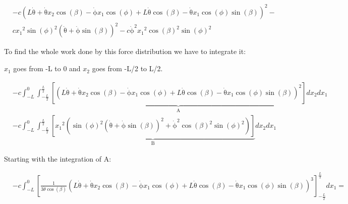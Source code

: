 \subsection{}
\begin{equation}
    \begin{split}
        &-c{\left(L\mathrm{\dot{\theta}}+\mathrm{\dot{\theta}}x_{2}\cos\left(\beta \right)-\mathrm{\dot{\phi}}x_{1}\cos\left(\phi \right)+L\mathrm{\dot{\theta}}\cos\left(\beta \right)-\mathrm{\dot{\theta}}x_{1}\cos\left(\phi \right)\sin\left(\beta \right)\right)}^2-\\
        &c{x_{1}}^2{\sin\left(\phi \right)}^2{\left(\mathrm{\dot{\theta}}+\mathrm{\dot{\phi}}\sin\left(\beta \right)\right)}^2-c{\mathrm{\dot{\phi}}}^2{x_{1}}^2{\cos\left(\beta \right)}^2{\sin\left(\phi \right)}^2 
    \end{split}
\end{equation}

To find the whole work done by this force distribution we have to integrate it:

$x_1$ goes from -L to 0 and $x_2$ goes from -L/2 to L/2.

\begin{equation}
    \begin{split}
        &-c\int_{-L}^0\int_{-\frac{L}{2}}^{\frac{L}{2}}
        \underbrace{\left[{\left(L\mathrm{\dot{\theta}}+\mathrm{\dot{\theta}}x_{2}\cos\left(\beta \right)-\mathrm{\dot{\phi}}x_{1}\cos\left(\phi \right)+L\mathrm{\dot{\theta}}\cos\left(\beta \right)-\mathrm{\dot{\theta}}x_{1}\cos\left(\phi \right)\sin\left(\beta \right)\right)}^2\right]}_{\text{A}}
        dx_2dx_1\\
        &-c\int_{-L}^0\int_{-\frac{L}{2}}^{\frac{L}{2}}
        \underbrace{\left[{x_{1}}^2\left({\sin\left(\phi \right)}^2{\left(\mathrm{\dot{\theta}}+\mathrm{\dot{\phi}}\sin\left(\beta \right)\right)}^2+{\mathrm{\dot{\phi}}}^2{\cos\left(\beta \right)}^2{\sin\left(\phi \right)}^2\right)\right]}_{\text{B}}
         dx_2dx_1
    \end{split}
\end{equation}

Starting with the integration of A:



\begin{equation}
    \begin{split}
        &-c\int_{-L}^0
        \left[\frac{1}{3\dot\theta\cos(\beta)}{\left(L\mathrm{\dot{\theta}}+\mathrm{\dot{\theta}}x_{2}\cos\left(\beta \right)-\mathrm{\dot{\phi}}x_{1}\cos\left(\phi \right)+L\mathrm{\dot{\theta}}\cos\left(\beta \right)-\mathrm{\dot{\theta}}x_{1}\cos\left(\phi \right)\sin\left(\beta \right)\right)}^3\right]
        _{-\frac{L}{2}}^\frac{L}{2}dx_1 =
    \end{split}
\end{equation}

